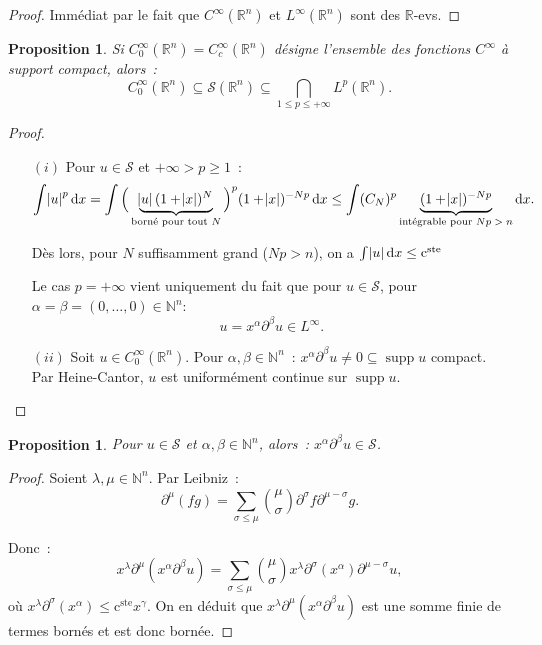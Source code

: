\documentclass{report}
\DeclareMathOperator{\supp}{supp}
\newcommand{\R}{{\mathbb R}}
\newcommand{\N}{{\mathbb N}}
\newcommand{\pinfty}{{+\infty}}
\newcommand{\cste}{\text{c}^{\text{ste}}}
\newtheorem{prp}[thm]{Proposition}
\theoremstyle{definition}
\theoremstyle{remark}
\begin{document}
\begin{proof} Immédiat par le fait que $C^\infty(\R^n)$ et $L^\infty(\R^n)$ sont des $\R$-evs.
\end{proof}

\begin{prp} Si $C^\infty_0(\R^n) = C^\infty_c(\R^n)$ désigne l'ensemble des fonctions $C^\infty$ à support compact, alors~:
\[C^\infty_0(\R^n) \subseteq \mathcal S(\R^n) \subseteq \bigcap_{1 \leq p \leq \pinfty} L^p(\R^n).\]
\end{prp}

\begin{proof}~
\begin{itemize}
	\item[$(i)$] Pour $u \in \mathcal S$ et $\pinfty > p \geq 1$~:
	\[\int \abs u^p\dif x = \int \Big(\underbrace{\abs u(1+\abs x)^N}_{\text{borné pour tout $N$}}\Big)^p(1+\abs x)^{-Np}\dif x
		\leq \int (C_N)^p\underbrace {(1+\abs x)^{-Np}}_{\text{intégrable pour $Np > n$}}\dif x.\]

	Dès lors, pour $N$ suffisamment grand ($Np>n$), on a $\int \abs u\dif x \leq \cste$

	Le cas $p = \pinfty$ vient uniquement du fait que pour $u \in \mathcal S$, pour $\alpha = \beta = (0, \ldots, 0) \in \N^n$:
	\[u = x^\alpha\partial^\beta u \in L^\infty.\]

	\item[$(ii)$] Soit $u \in C^\infty_0(\R^n)$. Pour $\alpha, \beta \in \N^n$~: $x^\alpha\partial^\beta u \neq 0 \subseteq \supp u$ compact. Par Heine-Cantor,
	$u$ est uniformément continue sur $\supp u$.
\end{itemize}
\end{proof}

\begin{prp} Pour $u \in \mathcal S$ et $\alpha, \beta \in \N^n$, alors~: $x^\alpha\partial^\beta u \in \mathcal S$.
\end{prp}

\begin{proof} Soient $\lambda, \mu \in \N^n$. Par Leibniz~:
\[\partial^\mu(fg) = \sum_{\sigma \leq \mu}\binom \mu\sigma\partial^\sigma f \partial^{\mu-\sigma} g.\]

Donc~:
\[x^\lambda\partial^\mu(x^\alpha\partial^\beta u) = \sum_{\sigma \leq \mu}\binom \mu\sigma x^\lambda\partial^\sigma(x^\alpha)\partial^{\mu-\sigma}u,\]
où $x^\lambda\partial^\sigma(x^\alpha) \leq \cste x^\gamma$. On en déduit que $x^\lambda\partial^\mu(x^\alpha\partial^\beta u)$ est une somme finie de termes
bornés et est donc bornée.
\end{proof}
\end{document}
